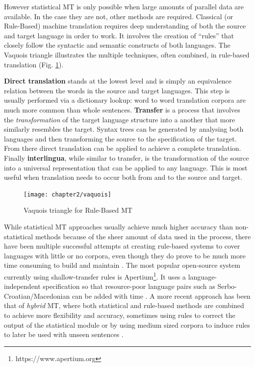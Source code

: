 \documentclass[12pt]{ociamthesis}  %
\begin{document}
However statistical MT is only possible when large amounts of parallel data are available. In the case they are not, other methods are required. Classical (or Rule-Based) machine translation requires deep understanding of both the source and target language in order to work. It involves the creation of ``rules'' that closely follow the syntactic and semantic constructs of both languages. The Vaquois triangle illustrates the multiple techniques, often combined, in rule-based translation (Fig. \ref{fig:vaquois}). 

\textbf{Direct translation} stands at the lowest level and is simply an equivalence relation between the words in the source and target languages. This step is usually performed via a dictionary lookup: word to word translation corpora are much more common than whole sentences. \textbf{Transfer} is a process that involves the \textit{transformation} of the target language structure into a another that more similarly resembles the target. Syntax trees can be generated by analysing both languages and then transforming the source to the specification of the target. From there direct translation can be applied to achieve a complete translation. Finally \textbf{interlingua}, while similar to transfer, is the transformation of the source into a universal representation that can be applied to any language. This is most useful when translation needs to occur both from and to the source and target.

\begin{figure}[h]
	\centering
    \texttt{[image: chapter2/vaquois]}
    \caption{Vaquois triangle for Rule-Based MT}
    \label{fig:vaquois}
\end{figure}
While statistical MT approaches usually achieve much higher accuracy than non-statistical methods because of the sheer amount of data used in the process, there have been multiple successful attempts at creating rule-based systems to cover languages with little or no corpora, even though they do prove to be much more time consuming to build and maintain . The most popular open-source system currently using shallow-transfer rules is Apertium\footnote{https://www.apertium.org}. It uses a language-independent specification so that resource-poor language pairs such as Serbo-Croatian/Macedonian can be added with time . A more recent approach has been that of \textit{hybrid} MT, where both statistical and rule-based methods are combined to achieve more flexibility and accuracy, sometimes using rules to correct the output of the statistical module   or by using medium sized corpora to induce rules to later be used with unseen sentences  .
\end{document}
